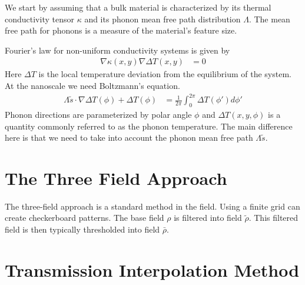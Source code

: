 \documentclass[book.tex]{subfiles}
\begin{document}
We start by assuming that a bulk material is characterized by its thermal conductivity tensor $\kappa$ and its phonon mean free path distribution $\Lambda$. The mean free path for phonons is a measure of the material's feature size.

Fourier's law for non-uniform conductivity systems is given by
\begin{align}
    \nabla \kappa(x, y) \nabla \Delta T(x, y) &= 0
\end{align}
Here $\Delta T$ is the local temperature deviation from the equilibrium of the system. At the nanoscale we need Boltzmann's equation. 
\begin{align}
    \Lambda \tilde{s} \cdot \nabla \Delta T(\phi) + \Delta T(\phi) &= \frac{1}{2\pi} \int_0^{2\pi} \Delta T(\phi') d\phi'
\end{align}
Phonon directions are parameterized by polar angle $\phi$ and $\Delta T(x, y, \phi)$ is a quantity commonly referred to as the phonon temperature. 
The main difference here is that we need to take into account the phonon mean free path $\Lambda \tilde{s}$.



\section{The Three Field Approach}

The three-field approach is a standard method in the field. Using a finite grid can create checkerboard patterns. The base field $\rho$ is filtered into field $\tilde{\rho}$. This filtered field is then typically thresholded into field $\bar{\rho}$. 



\section{Transmission Interpolation Method}
\end{document}
